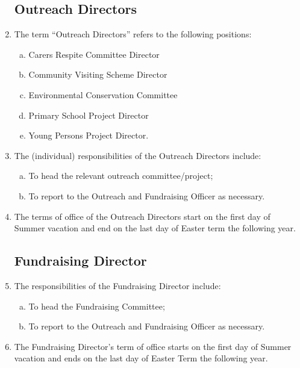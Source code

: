 \documentclass[12pt]{article}
\begin{document}
\begin{enumerate}
    \subsection{Outreach Directors}
    \item\label{def:outreach-directors} The term ``Outreach Directors'' refers to the following positions:
    \begin{enumerate}[(a)]
        \item Carers Respite Committee Director
        \item Community Visiting Scheme Director
        \item Environmental Conservation Committee
        \item Primary School Project Director
        \item Young Persons Project Director.
    \end{enumerate}
    \item The (individual) responsibilities of the Outreach Directors include:
    \begin{enumerate}[(a)]
        \item To head the relevant outreach committee/project;
        \item To report to the Outreach and Fundraising Officer as necessary.
    \end{enumerate}
    \item The terms of office of the Outreach Directors start on the first day of Summer vacation and end on the last day of Easter term the following year.

    \subsection{Fundraising Director}
    \item The responsibilities of the Fundraising Director include:
    \begin{enumerate}[(a)]
        \item To head the Fundraising Committee;
        \item To report to the Outreach and Fundraising Officer as necessary.
    \end{enumerate}
    \item The Fundraising Director's term of office starts on the first day of Summer vacation and ends on the last day of Easter Term the following year.


\end{enumerate}
\end{document}
